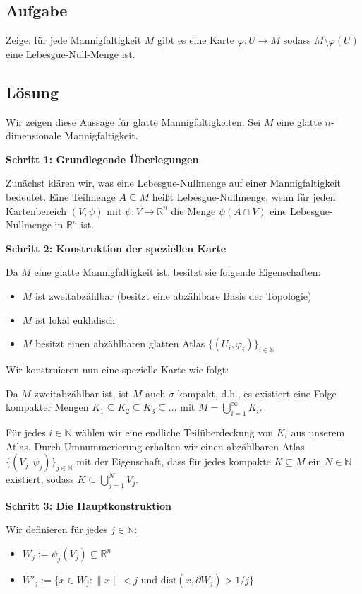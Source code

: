 \documentclass{article}
\begin{document}
\subsection*{Aufgabe}
Zeige: für jede Mannigfaltigkeit $M$ gibt es eine Karte $\varphi: U \to M$ sodass $M \setminus \varphi(U)$ eine Lebesgue-Null-Menge ist.

\subsection*{Lösung}

Wir zeigen diese Aussage für glatte Mannigfaltigkeiten. Sei $M$ eine glatte $n$-dimensionale Mannigfaltigkeit.

\textbf{Schritt 1: Grundlegende Überlegungen}

Zunächst klären wir, was eine Lebesgue-Nullmenge auf einer Mannigfaltigkeit bedeutet. Eine Teilmenge $A \subseteq M$ heißt Lebesgue-Nullmenge, wenn für jeden Kartenbereich $(V, \psi)$ mit $\psi: V \to \mathbb{R}^n$ die Menge $\psi(A \cap V)$ eine Lebesgue-Nullmenge in $\mathbb{R}^n$ ist.

\textbf{Schritt 2: Konstruktion der speziellen Karte}

Da $M$ eine glatte Mannigfaltigkeit ist, besitzt sie folgende Eigenschaften:
\begin{itemize}
\item $M$ ist zweitabzählbar (besitzt eine abzählbare Basis der Topologie)
\item $M$ ist lokal euklidisch
\item $M$ besitzt einen abzählbaren glatten Atlas $\{(U_i, \varphi_i)\}_{i \in \mathbb{N}}$
\end{itemize}

Wir konstruieren nun eine spezielle Karte wie folgt:

Da $M$ zweitabzählbar ist, ist $M$ auch $\sigma$-kompakt, d.h., es existiert eine Folge kompakter Mengen $K_1 \subseteq K_2 \subseteq K_3 \subseteq \ldots$ mit $M = \bigcup_{i=1}^{\infty} K_i$.

Für jedes $i \in \mathbb{N}$ wählen wir eine endliche Teilüberdeckung von $K_i$ aus unserem Atlas. Durch Umnummerierung erhalten wir einen abzählbaren Atlas $\{(V_j, \psi_j)\}_{j \in \mathbb{N}}$ mit der Eigenschaft, dass für jedes kompakte $K \subseteq M$ ein $N \in \mathbb{N}$ existiert, sodass $K \subseteq \bigcup_{j=1}^{N} V_j$.

\textbf{Schritt 3: Die Hauptkonstruktion}

Wir definieren für jedes $j \in \mathbb{N}$:
\begin{itemize}
\item $W_j := \psi_j(V_j) \subseteq \mathbb{R}^n$
\item $W'_j := \{x \in W_j : \|x\| < j \text{ und } \text{dist}(x, \partial W_j) > 1/j\}$
\end{itemize}
\end{document}
